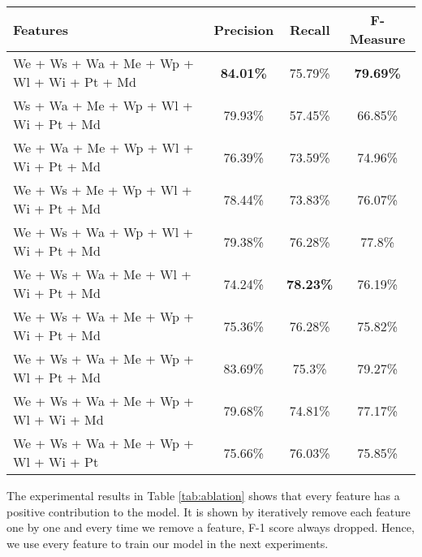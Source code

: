 \begin{table*}
	\caption{Feature Ablation Study Result}
	\label{tab:ablation}
	\begin{tabular}{lccc}
		\toprule
		Features&Precision&Recall&F-Measure\\
		\midrule
		We + Ws + Wa + Me + Wp + Wl + Wi + Pt + Md & \textbf{84.01\%} & 75.79\% & \textbf{79.69\%} \\
		
		Ws + Wa + Me + Wp + Wl + Wi + Pt + Md & 79.93\% & 57.45\% & 66.85\% \\
		
		We + Wa + Me + Wp + Wl + Wi + Pt + Md & 76.39\% & 73.59\% & 74.96\% \\
		
		We + Ws + Me + Wp + Wl + Wi + Pt + Md & 78.44\% & 73.83\% & 76.07\% \\
		
		We + Ws + Wa + Wp + Wl + Wi + Pt + Md & 79.38\% & 76.28\% & 77.8\% \\
		
		We + Ws + Wa + Me + Wl + Wi + Pt + Md & 74.24\% & \textbf{78.23\%} & 76.19\% \\
		
		We + Ws + Wa + Me + Wp + Wi + Pt + Md & 75.36\% & 76.28\% & 75.82\% \\
		
		We + Ws + Wa + Me + Wp + Wl + Pt + Md & 83.69\% & 75.3\% & 79.27\% \\
		
		We + Ws + Wa + Me + Wp + Wl + Wi + Md & 79.68\% & 74.81\% & 77.17\% \\
		
		We + Ws + Wa + Me + Wp + Wl + Wi + Pt & 75.66\% & 76.03\% & 75.85\% \\
		\bottomrule
	\end{tabular}
\end{table*}


The experimental results in Table \ref{tab:ablation} shows that every feature has a positive contribution to the model. It is shown by iteratively remove each feature one by one and every time we remove a feature, F-1 score always dropped. Hence, we use every feature to train our model in the next experiments.
\fi
